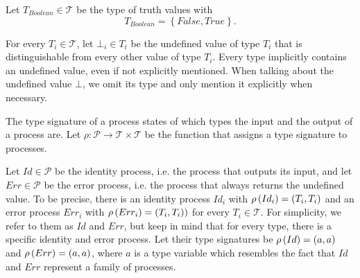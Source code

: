 \begin{definition}
Let $T_{Boolean} \in \mathcal{T}$ be the type of truth values with
\begin{equation*}
  T_{Boolean} = \left\{False, True \right\}.
\end{equation*}

\hfill\qedsymbol
\end{definition}

\begin{definition}
For every $T_i \in \mathcal{T}$, let $\bot_i \in T_i$ be the undefined value of type $T_i$ that is distinguishable from every other value of type $T_i$. Every type implicitly contains an undefined value, even if not explicitly mentioned. When talking about the undefined value $\bot$, we omit its type and only mention it explicitly when necessary.

\hfill\qedsymbol
\end{definition}


\begin{definition}
\label{def:type_signature}
The type signature of a process states of which types the input and the output of a process are. Let $\rho \colon \mathcal{P} \to \mathcal{T} \times \mathcal{T}$ be the function that assigns a type signature to processes.

\hfill\qedsymbol
\end{definition}


\begin{definition}
\label{def:static_id_err}
Let $Id \in \mathcal{P}$ be the identity process, i.e. the process that outputs its input, and let $Err \in \mathcal{P}$ be the error process, i.e. the process that always returns the undefined value. To be precise, there is an identity process $Id_i$ with $\rho \left( Id_i \right) = \left( T_i, T_i \right)$ and an error process $Err_i$ with $\rho \left( Err_i \right) = \left( T_i, T_i \right))$ for every $T_i \in \mathcal{T}$. For simplicity, we refer to them as $Id$ and $Err$, but keep in mind that for every type, there is a specific identity and error process. Let their type signatures be $\rho \left( Id \right) = \left( a, a \right)$ and $\rho \left( Err \right) = \left( a, a \right)$, where $a$ is a type variable which resembles the fact that $Id$ and $Err$ represent a family of processes.

\hfill\qedsymbol
\end{definition}

